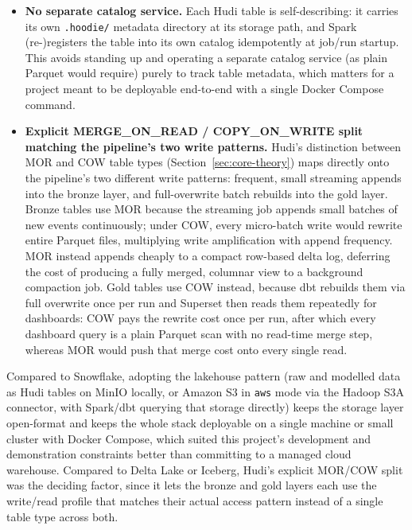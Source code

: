 \begin{itemize}
    \item \textbf{No separate catalog service.} Each Hudi table is self-describing: it carries its own \texttt{.hoodie/} metadata directory at its storage path, and Spark (re-)registers the table into its own catalog idempotently at job/run startup. This avoids standing up and operating a separate catalog service (as plain Parquet would require) purely to track table metadata, which matters for a project meant to be deployable end-to-end with a single Docker Compose command.
    \item \textbf{Explicit MERGE\_ON\_READ / COPY\_ON\_WRITE split matching the pipeline's two write patterns.} Hudi's distinction between MOR and COW table types (Section~\ref{sec:core-theory}) maps directly onto the pipeline's two different write patterns: frequent, small streaming appends into the bronze layer, and full-overwrite batch rebuilds into the gold layer. Bronze tables use MOR because the streaming job appends small batches of new events continuously; under COW, every micro-batch write would rewrite entire Parquet files, multiplying write amplification with append frequency. MOR instead appends cheaply to a compact row-based delta log, deferring the cost of producing a fully merged, columnar view to a background compaction job. Gold tables use COW instead, because dbt rebuilds them via full overwrite once per run and Superset then reads them repeatedly for dashboards: COW pays the rewrite cost once per run, after which every dashboard query is a plain Parquet scan with no read-time merge step, whereas MOR would push that merge cost onto every single read.
\end{itemize}

Compared to Snowflake, adopting the lakehouse pattern (raw and modelled data as Hudi tables on MinIO locally, or Amazon S3 in \texttt{aws} mode via the Hadoop S3A connector, with Spark/dbt querying that storage directly) keeps the storage layer open-format and keeps the whole stack deployable on a single machine or small cluster with Docker Compose, which suited this project's development and demonstration constraints better than committing to a managed cloud warehouse. Compared to Delta Lake or Iceberg, Hudi's explicit MOR/COW split was the deciding factor, since it lets the bronze and gold layers each use the write/read profile that matches their actual access pattern instead of a single table type across both.

